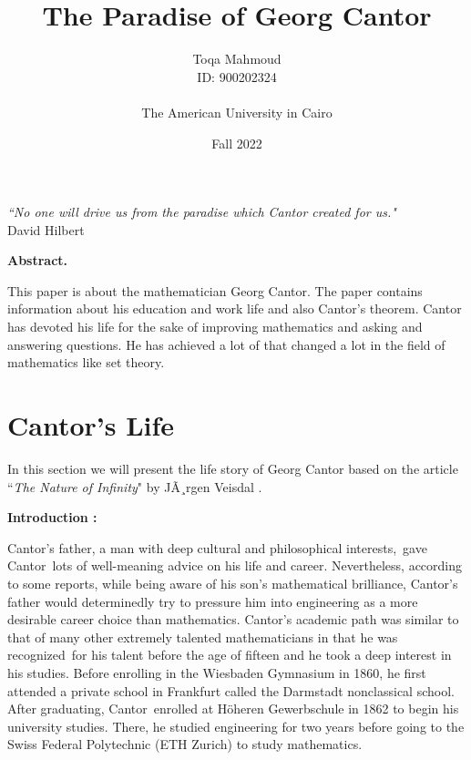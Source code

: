 \documentclass[12pt, a4paper]{article}
\title{\textbf{The Paradise of Georg Cantor}}
\author{Toqa Mahmoud \\ ID: 900202324 \\ ~ \\ The American University in Cairo}
\date{Fall 2022}
\theoremstyle{plain}
\begin{document}
\maketitle

\vspace{1cm}

\begin{center}
\textit{``No one will drive us from the paradise which Cantor created for us."}\\
David Hilbert
\end{center}

\vspace{2cm}



\textbf{Abstract.}

This paper is about the mathematician Georg Cantor. The paper contains information about his education and work life and also Cantor's theorem. Cantor has devoted his life for the sake of improving mathematics and asking and answering questions. He has achieved a lot of that changed a lot in the field of mathematics like set theory.  

\newpage

\section{Cantor's Life}

In this section we will present the life story of Georg Cantor based on the article ``\textit{The Nature of Infinity}" by JÃ¸rgen Veisdal \cite{Veisdal}. 

\vspace{0.5cm}

\textbf{Introduction : } 

Cantor's father, a man with deep cultural and philosophical interests, gave Cantor lots of well-meaning advice on his life and career. Nevertheless, according to some reports, while being aware of his son's mathematical brilliance, Cantor's father would determinedly try to pressure him into engineering as a more desirable career choice than mathematics. Cantor's academic path was similar to that of many other extremely talented mathematicians in that he was recognized for his talent before the age of fifteen and he took a deep interest in his studies. Before enrolling in the Wiesbaden Gymnasium in 1860, he first attended a private school in Frankfurt called the Darmstadt nonclassical school. After graduating, Cantor enrolled at Höheren Gewerbschule in 1862 to begin his university studies. There, he studied engineering for two years before going to the Swiss Federal Polytechnic (ETH Zurich) to study mathematics. 
\end{document}
